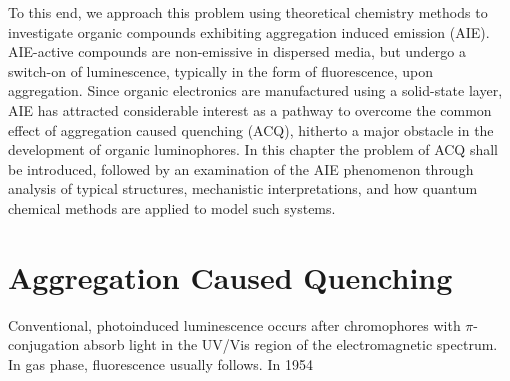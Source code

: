 To this end, we approach this problem using theoretical chemistry methods to investigate organic compounds exhibiting aggregation induced emission (AIE).  AIE-active compounds are non-emissive in dispersed media, but undergo a switch-on of luminescence, typically in the form of fluorescence, upon aggregation. Since organic electronics are manufactured using a solid-state layer, AIE has attracted considerable interest as a pathway to overcome the common effect of aggregation caused quenching (ACQ), hitherto a major obstacle in the development of organic luminophores. In this chapter the problem of ACQ shall be introduced, followed by an examination of the AIE phenomenon through analysis of typical structures, mechanistic interpretations, and how quantum chemical methods are applied to model such systems.
\section{Aggregation Caused Quenching}\label{section: lom ACQ}
Conventional, photoinduced luminescence occurs after chromophores with $\pi$-conjugation absorb light in the UV/Vis region of the electromagnetic spectrum. In gas phase, fluorescence usually follows. In 1954   
